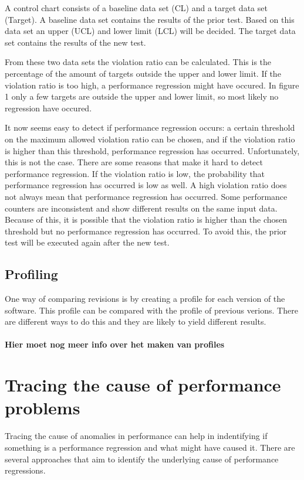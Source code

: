 A control chart consists of a baseline data set (CL) and a target data set (Target). A baseline data set contains the results of the prior test. Based on this data set an upper (UCL) and lower limit (LCL) will be decided. The target data set contains the results of the new test.

From these two data sets the violation ratio can be calculated. This is the percentage of the amount of targets outside the upper and lower limit. If the violation ratio is too high, a performance regression might have occured. In figure 1 only a few targets are outside the upper and lower limit, so most likely no regression have occured.

It now seems easy to detect if performance regression occurs: a certain threshold on the maximum allowed violation ratio can be chosen, and if the violation ratio is higher than this threshold, performance regression has occurred. Unfortunately, this is not the case. There are some reasons that make it hard to detect performance regression. If the violation ratio is low, the probability that performance regression has occurred is low as well. A high violation ratio does not always mean that performance regression has occurred. Some performance counters are inconsistent and show different results on the same input data. Because of this, it is possible that the violation ratio is higher than the chosen threshold but no performance regression has occurred. To avoid this, the prior test will be executed again after the new test.

\subsection{Profiling}
One way of comparing revisions is by creating a profile for each version of the software. This profile can be compared with the profile of previous verions. There are different ways to do this and they are likely to yield different results.
\\\\
\textbf{Hier moet nog meer info over het maken van profiles}

\section{Tracing the cause of performance problems}
Tracing the cause of anomalies in performance can help in indentifying if something is a performance regression and what might have caused it. There are several approaches that aim to identify the underlying cause of performance regressions.

